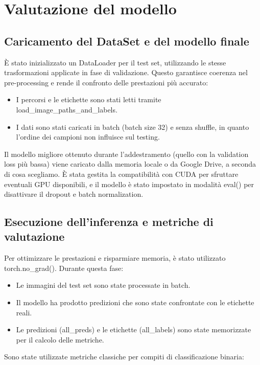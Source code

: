 \documentclass[main.tex]{subfiles}
\begin{document}
\section{Valutazione del modello}\label{sec:cap 5}
\subsection{Caricamento del DataSet e del modello finale}

È stato inizializzato un DataLoader per il test set, utilizzando le stesse trasformazioni applicate in fase di validazione. Questo garantisce coerenza nel pre-processing e rende il confronto delle prestazioni più accurato:

\begin{itemize}
    \item I percorsi e le etichette sono stati letti tramite load\_image\_paths\_and\_labels.
    \item I dati sono stati caricati in batch (batch size 32) e senza shuffle, in quanto l'ordine dei campioni non influisce sul testing.
\end{itemize}

\noindent Il modello migliore ottenuto durante l’addestramento (quello con la validation loss più bassa) viene caricato dalla memoria locale o da Google Drive, a seconda di cosa scegliamo. È stata gestita la compatibilità con CUDA per sfruttare eventuali GPU disponibili, e il modello è stato impostato in modalità eval() per disattivare il dropout e batch normalization.

\subsection{Esecuzione dell'inferenza e metriche di valutazione}

Per ottimizzare le prestazioni e risparmiare memoria, è stato utilizzato torch.no\_grad(). Durante questa fase:

\begin{itemize}
    \item Le immagini del test set sono state processate in batch.
    \item Il modello ha prodotto predizioni che sono state confrontate con le etichette reali.
    \item Le predizioni (all\_preds) e le etichette (all\_labels) sono state memorizzate per il calcolo delle metriche.
\end{itemize}
Sono state utilizzate metriche classiche per compiti di classificazione binaria:
\end{document}

